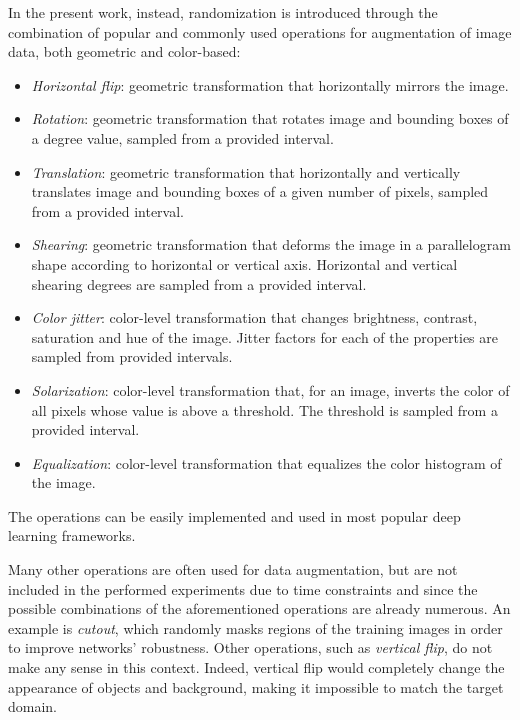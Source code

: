 \documentclass[%
    corpo=12pt,
    twoside,
    stile=classica,   
    tipotesi=magistrale,
    evenboxes,
    english,
	numerazioneromana,
]{toptesi}
\begin{document}
In the present work, instead, randomization is introduced through the combination of popular and commonly used operations for augmentation of image data, both geometric and color-based:
\begin{itemize}
	\item \textit{Horizontal flip}: geometric transformation that horizontally mirrors the image.
	\item \textit{Rotation}: geometric transformation that rotates image and bounding boxes of a degree value, sampled from a provided interval.
	\item \textit{Translation}: geometric transformation that horizontally and vertically translates image and bounding boxes of a given number of pixels, sampled from a provided interval.
	\item \textit{Shearing}: geometric transformation that deforms the image in a parallelogram shape according to horizontal or vertical axis. Horizontal and vertical shearing degrees are sampled from a provided interval.
	\item \textit{Color jitter}: color-level transformation that changes brightness, contrast, saturation and hue of the image. Jitter factors for each of the properties are sampled from provided intervals.
	\item \textit{Solarization}: color-level transformation that, for an image, inverts the color of all pixels whose value is above a threshold. The threshold is sampled from a provided interval.
	\item \textit{Equalization}: color-level transformation that equalizes the color histogram of the image.
\end{itemize}
The operations can be easily implemented and used in most popular deep learning frameworks.

\medskip
Many other operations are often used for data augmentation, but are not included in the performed experiments due to time constraints and since the possible combinations of the aforementioned operations are already numerous. An example is \textit{cutout}, which randomly masks regions of the training images in order to improve networks' robustness. Other operations, such as \textit{vertical flip}, do not make any sense in this context. Indeed, vertical flip would completely change the appearance of objects and background, making it impossible to match the target domain.
\end{document}
